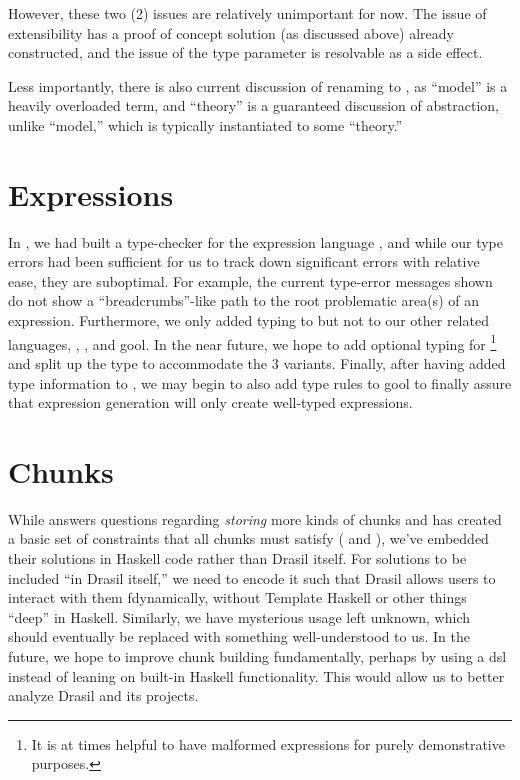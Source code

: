 However, these two (2) issues are relatively unimportant for now. The issue of
extensibility has a proof of concept solution (as discussed above) already
constructed, and the issue of the type parameter is resolvable as a side effect.

Less importantly, there is also current discussion of renaming \ModelKinds{} to
\TheoryKind{} \cite{DrasilIssue2599RenamingModels}, as ``model'' is a heavily
overloaded term, and ``theory'' is a guaranteed discussion of abstraction,
unlike ``model,'' which is typically instantiated to some ``theory.''

\section{Expressions}
\label{chap:futureWork:sec:expressions}

In , we had built a type-checker for the expression
language \Expr{}, and while our type errors had been sufficient for us to track
down significant errors with relative ease, they are suboptimal. For example,
the current type-error messages shown do not show a ``breadcrumbs''-like path to
the root problematic area(s) of an expression. Furthermore, we only added typing
to \Expr{} but not to our other related languages, \CodeExpr{}, \ModelExpr{},
and \acs{gool}. In the near future, we hope to add optional typing for
\ModelExpr{}\footnote{It is at times helpful to have malformed expressions for
purely demonstrative purposes.} and split up the \Space{} type to accommodate
the 3 variants. Finally, after having added type information to \CodeExpr{}, we
may begin to also add type rules to \acs{gool} to finally assure that
expression generation will only create well-typed expressions.

\section{Chunks}
\label{chap:futureWork:sec:chunks}

While  answers questions regarding \textit{storing}
more kinds of chunks and has created a basic set of constraints that all chunks
must satisfy (\HasUID{} and \HasChunkRefs{}), we've embedded their solutions in
Haskell code rather than Drasil itself. For solutions to be included ``in Drasil
itself,'' we need to encode it such that Drasil allows users to interact with
them fdynamically, without Template Haskell\cite{GHC2020TemplateHaskell} or
other things ``deep'' in Haskell. Similarly, we have mysterious \Typeable{}
usage left unknown, which should eventually be replaced with something
well-understood to us. In the future, we hope to improve chunk building
fundamentally, perhaps by using a \acs{dsl} instead of leaning on built-in
Haskell functionality. This would allow us to better analyze Drasil and its
projects.

